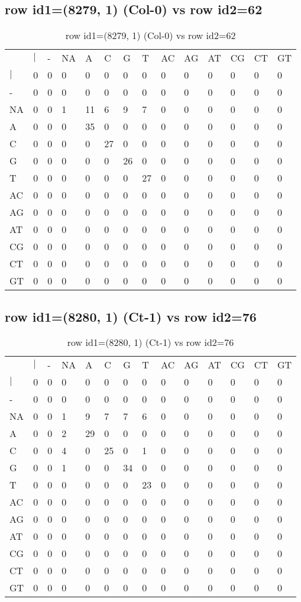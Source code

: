 \subsection{row id1=(8279, 1) (Col-0) vs row id2=62}
\begin{center}
\begin{longtable}{|l|l|l|l|l|l|l|l|l|l|l|l|l|l|}
\caption{row id1=(8279, 1) (Col-0) vs row id2=62} \label{table_dm440}\\
\hline
\\
\hline
&$|$&-&NA&A&C&G&T&AC&AG&AT&CG&CT&GT\\
$|$&0&0&0&0&0&0&0&0&0&0&0&0&0\\
-&0&0&0&0&0&0&0&0&0&0&0&0&0\\
NA&0&0&1&11&6&9&7&0&0&0&0&0&0\\
A&0&0&0&35&0&0&0&0&0&0&0&0&0\\
C&0&0&0&0&27&0&0&0&0&0&0&0&0\\
G&0&0&0&0&0&26&0&0&0&0&0&0&0\\
T&0&0&0&0&0&0&27&0&0&0&0&0&0\\
AC&0&0&0&0&0&0&0&0&0&0&0&0&0\\
AG&0&0&0&0&0&0&0&0&0&0&0&0&0\\
AT&0&0&0&0&0&0&0&0&0&0&0&0&0\\
CG&0&0&0&0&0&0&0&0&0&0&0&0&0\\
CT&0&0&0&0&0&0&0&0&0&0&0&0&0\\
GT&0&0&0&0&0&0&0&0&0&0&0&0&0\\
\hline
\end{longtable}
\end{center}

\subsection{row id1=(8280, 1) (Ct-1) vs row id2=76}
\begin{center}
\begin{longtable}{|l|l|l|l|l|l|l|l|l|l|l|l|l|l|}
\caption{row id1=(8280, 1) (Ct-1) vs row id2=76} \label{table_dm442}\\
\hline
\\
\hline
&$|$&-&NA&A&C&G&T&AC&AG&AT&CG&CT&GT\\
$|$&0&0&0&0&0&0&0&0&0&0&0&0&0\\
-&0&0&0&0&0&0&0&0&0&0&0&0&0\\
NA&0&0&1&9&7&7&6&0&0&0&0&0&0\\
A&0&0&2&29&0&0&0&0&0&0&0&0&0\\
C&0&0&4&0&25&0&1&0&0&0&0&0&0\\
G&0&0&1&0&0&34&0&0&0&0&0&0&0\\
T&0&0&0&0&0&0&23&0&0&0&0&0&0\\
AC&0&0&0&0&0&0&0&0&0&0&0&0&0\\
AG&0&0&0&0&0&0&0&0&0&0&0&0&0\\
AT&0&0&0&0&0&0&0&0&0&0&0&0&0\\
CG&0&0&0&0&0&0&0&0&0&0&0&0&0\\
CT&0&0&0&0&0&0&0&0&0&0&0&0&0\\
GT&0&0&0&0&0&0&0&0&0&0&0&0&0\\
\hline
\end{longtable}
\end{center}

